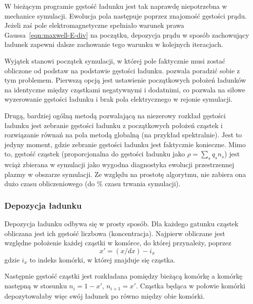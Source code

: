 W bieżącym programie gęstość ładunku jest tak naprawdę niepotrzebna w
mechanice symulacji. Ewolucja pola następuje poprzez znajomość gęstości prądu.
Jeżeli zaś pole elektromagnetyczne spełniało warunek
prawa Gaussa~\ref{eqn:maxwell-E-div} na początku, depozycja prądu w sposób
zachowujący ładunek zapewni dalsze zachowanie tego warunku w kolejnych
iteracjach.~\cite{bunemanvillasenor}

Wyjątek stanowi początek symulacji, w której pole faktycznie musi zostać
obliczone od podstaw na podstawie gęstości ładunku. \pythonpic{} pozwala
poradzić sobie z tym problemem. Pierwszą opcją jest ustawienie początkowych
położeń ładunków na identyczne między cząstkami negatywnymi i dodatnimi, co
pozwala na siłowe wyzerowanie gęstości ładunku i brak pola elektrycznego w
rejonie symulacji.

Drugą, bardziej ogólną metodą pozwalającą na niezerowy rozkład gęstości
ładunku jest zebranie gęstości ładunku z początkowych położeń cząstek i
rozwiązanie równań na pola metodą globalną (na przykład spektralnie). Jest
to jedyny moment, gdzie zebranie gęstości ładunku jest faktycznie konieczne.
Mimo to, gęstość cząstek (proporcjonalna do gęstości ładunku jako $\rho =
\sum_s q_s n_s$) jest wciąż zbierana w symulacji jako wygodna diagnostyka
ewolucji przestrzennej plazmy w obszarze symulacji. Ze względu na prostotę
algorytmu, nie zabiera ona dużo czasu obliczeniowego (do
\% czasu trwania symulacji).

\subsubsection{Depozycja ładunku}

 Depozycja ładunku odbywa się w prosty sposób. Dla każdego gatunku
cząstek obliczana jest ich gęstość liczbowa (koncentracja). Najpierw
obliczane jest względne położenie każdej cząstki w komórce, do której
przynależy, poprzez
\begin{equation}
x' = (x/dx) - i_x
\label{eqn:relative-position}
\end{equation}
gdzie $i_x$ to indeks komórki, w której znajduje się cząstka.

Następnie gęstość cząstki jest rozkładana pomiędzy bieżącą komórkę a
komórkę następną w stosunku $n_i = 1-x'$, $n_{i+1} = x'$. Cząstka będąca
w połowie komórki depozytowałaby więc swój ładunek po równo między obie
komórki.



